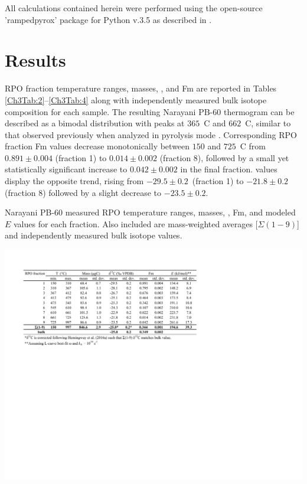 All calculations contained herein were performed using the open-source 'rampedpyrox' package for Python v.3.5 as described in \citet{Hemingway:bA3-kvLz}.

\section{Results}

RPO fraction temperature ranges,  masses, , and Fm are reported in Tables \ref{Ch3Tab:2}--\ref{Ch3Tab:4} along with independently measured bulk isotope composition for each sample. The resulting Narayani PB-60 thermogram can be described as a bimodal distribution with peaks at $365$\textdegree\ C and $662$\textdegree\ C, similar to that observed previously when analyzed in pyrolysis mode \citep[Figure \ref{Ch3Fig:2}A;][]{Rosenheim:2012kh}. Corresponding RPO fraction Fm values decrease monotonically between $150$ and $725$\textdegree\ C from $0.891 \pm 0.004$ (fraction 1) to $0.014 \pm 0.002$ (fraction 8), followed by a small yet statistically significant increase to $0.042 \pm 0.002$ in the final fraction.  values display the opposite trend, rising from $-29.5 \pm 0.2$\textperthousand\ (fraction 1) to $-21.8 \pm 0.2$\textperthousand (fraction 8) followed by a slight decrease to $-23.5 \pm 0.2$\textperthousand. 

\begin{table}
	\caption[Narayani PB-60 RPO results]{Narayani PB-60 measured RPO temperature ranges,  masses, , Fm, and modeled $E$ values for each fraction. Also included are mass-weighted averages [$\Sigma(1-9)$] and independently measured bulk isotope values.}
	\centering
		\includegraphics{Thesis_Tables/Ch3Tab2}
	\label{Ch3Tab:2} 
\end{table}

